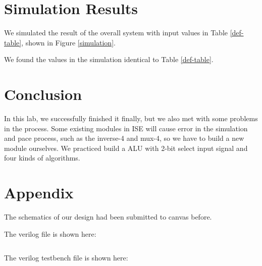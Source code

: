 \documentclass{article}
\begin{document}
\section{Simulation Results}
We simulated the result of the overall system with input values in Table \ref{def-table}, shown in Figure \ref{simulation}.


We found the values in the simulation identical to Table \ref{def-table}.


\newpage

\section{Conclusion}
In this lab, we successfully finished it finally, but we also met with some problems in the process. Some existing modules in ISE will cause error in the simulation and pace process, such as the inverse-4 and mux-4, so we have to build a new module ourselves. We practiced build a ALU with 2-bit select input signal and four kinds of  algorithms.

\section{Appendix}
The schematics of our design had been submitted to canvas before.

The verilog file is shown here:
\inputminted{verilog}{../lab4/counter_verilog.v}

The verilog testbench file is shown here:
\inputminted{verilog}{../lab4/counter_test.v}
\end{document}
